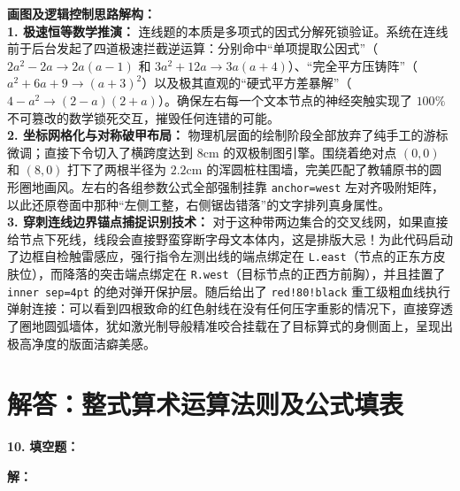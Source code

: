 \vspace{0.4cm}
{\small\color{blue!70!black}
\textbf{画图及逻辑控制思路解构：}\\
\textbf{1. 极速恒等数学推演：} 连线题的本质是多项式的因式分解死锁验证。系统在连线前于后台发起了四道极速拦截逆运算：分别命中“单项提取公因式”（$2a^2 - 2a \rightarrow 2a(a - 1)$ 和 $3a^2 + 12a \rightarrow 3a(a + 4)$）、“完全平方压铸阵”（$a^2 + 6a + 9 \rightarrow (a+3)^2$）以及极其直观的“硬式平方差暴解”（$4 - a^2 \rightarrow (2-a)(2+a)$）。确保左右每一个文本节点的神经突触实现了 $100\%$ 不可篡改的数学锁死交互，摧毁任何连错的可能。\\
\textbf{2. 坐标网格化与对称破甲布局：} 物理机层面的绘制阶段全部放弃了纯手工的游标微调；直接下令切入了横跨度达到 $8\mathrm{cm}$ 的双极制图引擎。围绕着绝对点 $(0,0)$ 和 $(8,0)$ 打下了两根半径为 $2.2\mathrm{cm}$ 的浑圆桩柱围墙，完美匹配了教辅原书的圆形圈地画风。左右的各组参数公式全部强制挂靠 \texttt{anchor=west} 左对齐吸附矩阵，以此还原卷面中那种“左侧工整，右侧锯齿错落”的文字排列真身属性。\\
\textbf{3. 穿刺连线边界锚点捕捉识别技术：} 对于这种带两边集合的交叉线网，如果直接给节点下死线，线段会直接野蛮穿断字母文本体内，这是排版大忌！为此代码启动了边框自检触雷感应，强行指令左测出线的端点绑定在 \texttt{L.east}（节点的正东方皮肤位），而降落的突击端点绑定在 \texttt{R.west}（目标节点的正西方前胸），并且挂置了 \texttt{inner sep=4pt} 的绝对弹开保护层。随后给出了 \texttt{red!80!black} 重工级粗血线执行弹射连接：可以看到四根致命的红色射线在没有任何压字重影的情况下，直接穿透了圈地圆弧墙体，犹如激光制导般精准咬合挂载在了目标算式的身侧面上，呈现出极高净度的版面洁癖美感。
}
\newpage


\newpage

\section{解答：整式算术运算法则及公式填表}

\vspace{0.6cm}

\textbf{\LARGE 10.} \textbf{填空题：}

\vspace{0.4cm}
\textbf{解：}

